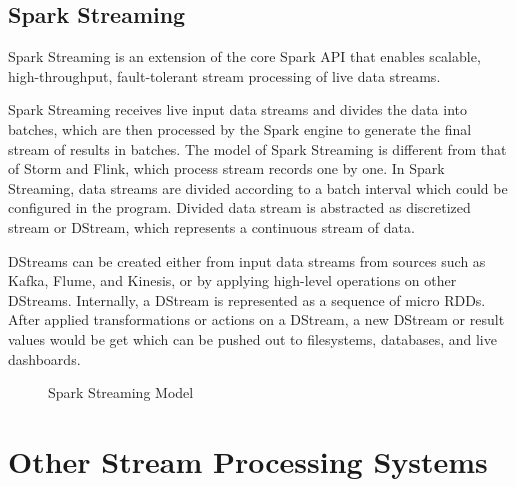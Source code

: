 \subsection{Spark Streaming}

Spark Streaming is an extension of the core Spark API that enables scalable, high-throughput, fault-tolerant stream processing of live data streams. 

Spark Streaming receives live input data streams and divides the data into batches, which are then processed by the Spark engine to generate the final stream of results in batches. The model of Spark Streaming is different from that of Storm and Flink, which process stream records one by one. In Spark Streaming, data streams are divided according to a batch interval which could be configured in the program. Divided data stream is abstracted as discretized stream or DStream, which represents a continuous stream of data. 

DStreams can be created either from input data streams from sources such as Kafka, Flume, and Kinesis, or by applying high-level operations on other DStreams. Internally, a DStream is represented as a sequence of micro RDDs. After applied transformations or actions on a DStream,   a new DStream or result values would be get which can be pushed out to filesystems, databases, and live dashboards.

\begin{figure}
  \begin{center}
   \caption{Spark Streaming Model}
   \label{fig:spark_stream}
  \end{center}
\end{figure}

\section{Other Stream Processing Systems}
